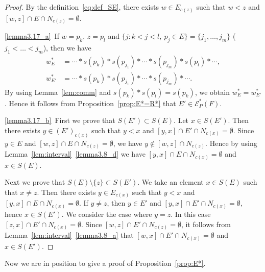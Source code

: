 \documentclass[ALCO,ThmDefs,Unicode,epreuves]{cedram}
\newcommand\EE{\mathcal{E}}
\begin{document}
\begin{proof}
By the definition~\eqref{eq:def_SE}, 
there exists $w \in E_{c(z)}$ such that $w < z$ and $[w,z] \cap E \cap N_{c(z)} = \emptyset$.

\ref{lemma3.17_a}~If $w = p_k$, $z = p_l$ and $\{ j : k < j < l, \ p_j \in E \} = \{ j_1, \dots, j_m \}$ 
($j_1 < \dots < j_m$), then we have 
\begin{align*}
w^*_E &= \cdots * s(p_k) * s(p_{j_1}) * \cdots * s(p_{j_m}) * s(p_l) * \cdots,
\\
w^*_{E'} &= \cdots * s(p_k) * s(p_{j_1}) * \cdots * s(p_{j_m}) * \cdots.
\end{align*}
By using Lemma~\ref{lem:comm} and $s(p_k)*s(p_l) = s(p_k)$, 
we obtain $w^*_E = w^*_{E'}$.
Hence it follows from Proposition~\ref{prop:E*=R*} that $E' \in \EE^*_P(F)$.

\ref{lemma3.17_b}~First we prove that $S(E') \subset S(E)$.
Let $x \in S(E')$.
Then there exists $y \in (E')_{c(x)}$ such that $y < x $ and $[y,x] \cap E' \cap N_{c(x)} = \emptyset$.
Since $y \in E$ and $[w,z] \cap E \cap N_{c(z)} = \emptyset$, we have $y \not\in [w,z] \cap N_{c(z)}$.
Hence by using Lemma~\ref{lem:interval}~\ref{lemma3.8_d} we have $[y,x] \cap E \cap N_{c(x)} = \emptyset$ and $x \in S(E)$.

Next we prove that $S(E) \setminus \{ z \} \subset S(E')$.
We take an element $x \in S(E)$ such that $x \neq z$.
Then there exists $y \in E_{c(x)}$ such that $y<x$ and $[y,x] \cap E \cap N_{c(x)} = \emptyset$.
If $y \neq z$, then $y \in E'$ and $[y,x] \cap E' \cap N_{c(x)} = \emptyset$, hence $x \in S(E')$.
We consider the case where $y = z$.
In this case $[z,x] \cap E' \cap N_{c(x)} = \emptyset$.
Since $[w,z] \cap E' \cap N_{c(z)} = \emptyset$, it follows from Lemma~\ref{lem:interval}~\ref{lemma3.8_a} 
that $[w,x] \cap E' \cap N_{c(x)} = \emptyset$ and $x \in S(E')$.
\end{proof}

Now we are in position to give a proof of Proposition~\ref{prop:E*}.
\end{document}
